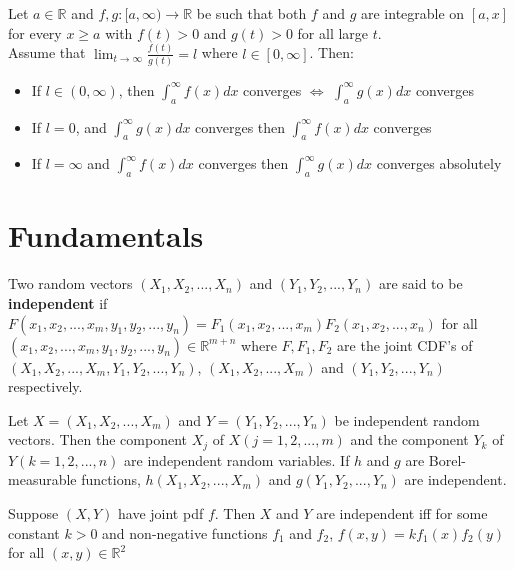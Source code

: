 \begin{prop}
    Let $a \in \mathbb{R}$ and $f,g: [a, \infty) \to \mathbb{R}$ be such that both $f$ and $g$ are integrable on $[a,x]$ for every $x \geq a$ with $f(t) > 0$ and $g(t) > 0$ for all large $t$. \\ Assume that
    $\displaystyle \lim_{t \to \infty} \frac{f(t)}{g(t)} = l$ where $l \in [0, \infty]$. Then:
    \begin{itemize}
        \item If $l \in (0, \infty)$, then $\int_a^\infty f(x)dx$ converges $\iff$ $\int_a^\infty g(x)dx$ converges
        \item If $l = 0$, and $\int_a^\infty g(x)dx$ converges then $\int_a^\infty f(x)dx$ converges
        \item If $l = \infty$ and $\int_a^\infty f(x)dx$ converges then $\int_a^\infty g(x)dx$ converges absolutely
    \end{itemize}
\end{prop}

\section*{Fundamentals}

\begin{defn}
    Two random vectors $(X_1, X_2, ... , X_n)$ and $(Y_1, Y_2, ... , Y_n)$ are said to be \textbf{independent} if $F(x_1, x_2, ..., x_m, y_1, y_2, ..., y_n) = F_1 (x_1, x_2, ..., x_m) F_2 (x_1, x_2, ..., x_n)$ for all $(x_1, x_2, ..., x_m, y_1, y_2, ..., y_n) \in \mathbb{R}^{m+n}$ where $F, F_1, F_2$ are the joint CDF's of $(X_1, X_2, ..., X_m, Y_1, Y_2, ..., Y_n)$, $(X_1, X_2, ..., X_m)$ and $(Y_1, Y_2, ..., Y_n)$ respectively.
\end{defn}

\begin{thm}
    Let $X = (X_1, X_2, ... , X_m)$ and $Y = (Y_1, Y_2, ... , Y_n)$ be independent random vectors. Then the component $X_j$ of $X(j = 1, 2, ... , m)$ and the component $Y_k$ of $Y(k = 1, 2, ... , n)$ are independent random variables. If $h$ and $g$ are Borel-measurable functions, $h(X_1, X_2, ..., X_m)$ and $g(Y_1, Y_2, ... , Y_n)$ are independent.
\end{thm}

\begin{thm}
    Suppose $(X,Y)$ have joint pdf $f$. Then $X$ and $Y$ are independent iff for some constant $k > 0$ and non-negative functions $f_1$ and $f_2$, $f(x,y) = k f_1(x)f_2(y)$ for all $(x,y) \in \mathbb{R}^2$
\end{thm}

